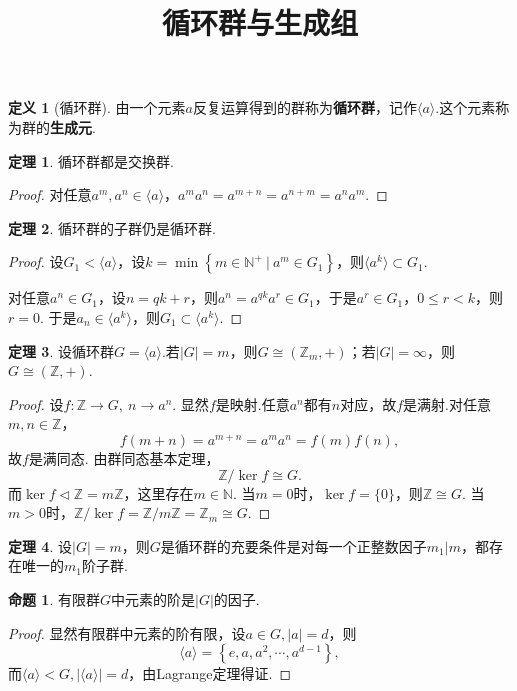 \documentclass[12pt]{ctexart}
\title{\vspace{-2em}\textbf{循环群与生成组}\vspace{-2em}}
\date{ }
\theoremstyle{definition}
\newtheorem{definition}{定义}
\newtheorem{theorem}{定理}
\newtheorem{proposition}{命题}
\theoremstyle{plain}
\begin{document}
	\maketitle
	\begin{definition}[循环群]
		由一个元素$a$反复运算得到的群称为\textbf{循环群}，记作$\langle a\rangle$.这个元素称为群的\textbf{生成元}.
	\end{definition}
	\begin{theorem}
		循环群都是交换群.
	\end{theorem}
	\begin{proof}
		对任意$a^m,a^n\in\langle a\rangle$，$a^ma^n=a^{m+n}=a^{n+m}=a^na^m$.
	\end{proof}
	\begin{theorem}
		循环群的子群仍是循环群.
	\end{theorem}
	\begin{proof}
		设$G_1<\langle a\rangle$，设$k=\min\left\{m\in\mathbb{N}^{+}\ |\ a^m\in G_1\right\}$，则$\langle a^k\rangle\subset G_1$.
		
		对任意$a^n\in G_1$，设$n=qk+r$，则$a^n=a^{qk}a^r\in G_1$，于是$a^r\in G_1$，$0\leqslant r<k$，则$r=0$. 于是$a_n\in\langle a^k\rangle$，则$G_1\subset\langle a^k\rangle$.
	\end{proof}
	\begin{theorem}
		设循环群$G=\langle a\rangle$.若$|G|=m$，则$G\cong(\mathbb{Z}_m,+)$；若$|G|=\infty$，则$G\cong(\mathbb{Z},+)$.
	\end{theorem}
	\begin{proof}
		设$f:\mathbb{Z}\to G,\ n\to a^n$. 显然$f$是映射.任意$a^n$都有$n$对应，故$f$是满射.对任意$m,n\in\mathbb{Z}$，
		$$f(m+n)=a^{m+n}=a^ma^n=f(m)f(n),$$
		故$f$是满同态. 由群同态基本定理，
		$$\mathbb{Z}/\ker f\cong G.$$
		而$\ker f\lhd\mathbb{Z}=m\mathbb{Z}$，这里存在$m\in\mathbb{N}$. 当$m=0$时，$\ker f=\{0\}$，则$\mathbb{Z}\cong G$. 当$m>0$时，$\mathbb{Z}/\ker f=\mathbb{Z}/m\mathbb{Z}=\mathbb{Z}_m\cong G$.
	\end{proof}
	\begin{theorem}
		设$|G|=m$，则$G$是循环群的充要条件是对每一个正整数因子$m_1|m$，都存在唯一的$m_1$阶子群.
	\end{theorem}
	\begin{proposition}\label{ord}
		有限群$G$中元素的阶是$|G|$的因子.
	\end{proposition}
	\begin{proof}
		显然有限群中元素的阶有限，设$a\in G,|a|=d$，则
		$$\langle a\rangle=\left\{e,a,a^2,\cdots,a^{d-1}\right\},$$
		而$\langle a\rangle<G,|\langle a\rangle|=d$，由Lagrange定理得证.
	\end{proof}
\end{document}
